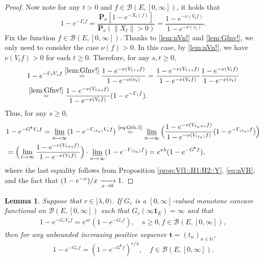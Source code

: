 \documentclass[12pt,a4paper]{amsart}
\numberwithin{equation}{section}
\theoremstyle{plain}
\newtheorem{lem}[thm]{Lemma}
\theoremstyle{definition}
\theoremstyle{remark}
\begin{document}
\begin{proof}
	Now note for any $t>0$ and $f\in \mathcal B(E,[0,\infty])$, it holds that
\begin{equation}\label{lem:Gfnv!}
	1 - e^{- \Gamma_t f}
	= \frac{ \mathbf P_\nu [ 1 - e^{- X_t(f)}]}{ \mathbf P_\nu (\|X_t\| > 0)}
	= \frac{ 1 - e^{- \nu(V_tf)} }{ 1 - e^{- \nu(v_t)}}.
\end{equation}
	Fix the function $f\in \mathcal B(E,[0,\infty])$.
Thanks to \eqref{lem:nVn!} and \eqref{lem:Gfnv!}, we only need to consider the case $\nu(f) > 0$.
	In this case, by \eqref{lem:nVn!}, we have $\nu(V_tf)>0$ for each $t\geq 0$.
	Therefore, for any $s,t\geq 0$,
	\begin{align}
	& 1 - e^{- \Gamma_t V_s f}
	\overset{\eqref{lem:Gfnv!}}= \frac{ 1 - e^{- \nu(V_{t+s} f)} }{ 1 - e^{- \nu(v_t)}}
	= \frac{ 1 - e^{- \nu(V_{t+s} f)} }{ 1 - e^{- \nu(V_tf)}} \frac{ 1 - e^{ - \nu(V_tf)}}{ 1 - e^{- \nu(v_t)}}
	\\ &  \label{eq:Gtb.5}\overset{\eqref{lem:Gfnv!}}= \frac{ 1 - e^{- \nu(V_{t+s} f)} }{ 1 - e^{- \nu(V_tf)}} ( 1 - e^{- \Gamma_t f}).
	\end{align}
	Thus, for any $s\geq 0$,
	\begin{align}
	& 1 - e^{- G^{\mathbf t} V_s f}
	= \varliminf_{n\to \infty} ( 1 - e^{- \Gamma_{(t_n)} V_s f})
	\overset{\text{\eqref{eq:Gtb.5}}}= \varliminf_{n\to \infty} \Big( \frac{ 1 - e^{- \nu(V_{t_n+s}f)}}{ 1 - e^{- \nu(V_{(t_n)}f)}} (1 - e^{- \Gamma_{(t_n)} f}) \Big)
	\\& = \Big( \lim_{t \to \infty} \frac{ 1 - e^{- \nu(V_{t+s}f)}}{ 1 - e^{- \nu(V_{t}f)}} \Big) \cdot \varliminf_{n\to \infty} (1 - e^{- \Gamma_{(t_n)} f} )
	= e^{s\lambda} (1 - e^{- G^{\mathbf t}f}),
	\end{align}
	where the last equality follows from Proposition \ref{prop:Vf1::H1:H2::Y}, \eqref{eq:nVR}, and the fact that
	$
	(1-e^{-x}) /x \xrightarrow[x\to 0]{} 1.
	\qedhere
	$
\end{proof}

\begin{lem} \label{prop:G*:H1:H2:H3:H4}
	Suppose that $r \in [\lambda,0)$.
	If $G_r$ is a $[0,\infty]$-valued monotone concave functional on $\mathcal B(E,[0,\infty])$ such that $G_r(\infty \mathbf 1_E) = \infty$ and that
	\begin{align}
	1 - e^{-G_r V_s f}
	= e^{s r} (1 - e^{- G_r f}),
	\quad s\geq 0, f\in \mathcal B(E,[0,\infty]),
	\end{align}
	then for any unbounded increasing positive sequence $\mathbf t = (t_n)_{n\in \mathbb N}$,
\begin{equation}
	1 - e^{-G_r f} = (1 - e^{- G^\mathbf t f})^{r/\lambda}, \quad f \in \mathcal B(E,[0,\infty]).
\end{equation}
\end{lem}
\end{document}

